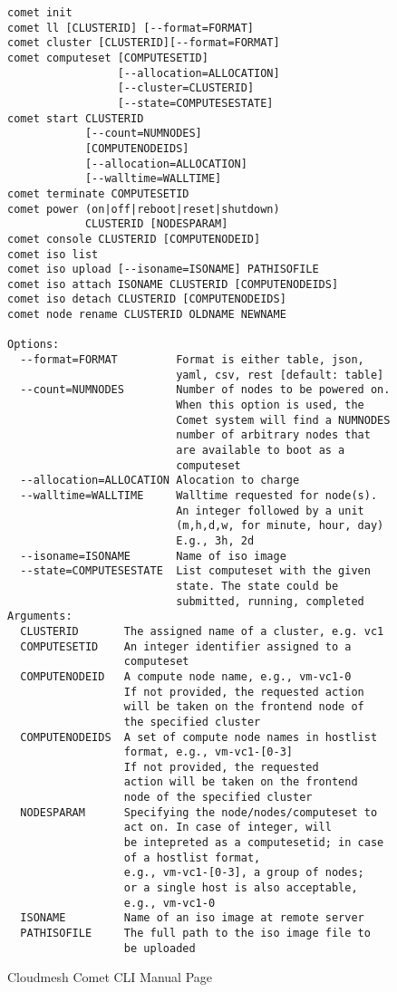 
\begin{figure}[!h]
\begin{small}
\begin{verbatim}
comet init
comet ll [CLUSTERID] [--format=FORMAT]
comet cluster [CLUSTERID][--format=FORMAT]
comet computeset [COMPUTESETID]
                 [--allocation=ALLOCATION]
                 [--cluster=CLUSTERID]
                 [--state=COMPUTESESTATE]
comet start CLUSTERID 
            [--count=NUMNODES]
            [COMPUTENODEIDS]
            [--allocation=ALLOCATION]
            [--walltime=WALLTIME]
comet terminate COMPUTESETID
comet power (on|off|reboot|reset|shutdown) 
            CLUSTERID [NODESPARAM]
comet console CLUSTERID [COMPUTENODEID]
comet iso list
comet iso upload [--isoname=ISONAME] PATHISOFILE
comet iso attach ISONAME CLUSTERID [COMPUTENODEIDS]
comet iso detach CLUSTERID [COMPUTENODEIDS]
comet node rename CLUSTERID OLDNAME NEWNAME

Options:
  --format=FORMAT         Format is either table, json, 
                          yaml, csv, rest [default: table]
  --count=NUMNODES        Number of nodes to be powered on. 
                          When this option is used, the 
                          Comet system will find a NUMNODES 
                          number of arbitrary nodes that
                          are available to boot as a 
                          computeset
  --allocation=ALLOCATION Alocation to charge 
  --walltime=WALLTIME     Walltime requested for node(s).
                          An integer followed by a unit 
                          (m,h,d,w, for minute, hour, day)
                          E.g., 3h, 2d
  --isoname=ISONAME       Name of iso image 
  --state=COMPUTESESTATE  List computeset with the given 
                          state. The state could be
                          submitted, running, completed
Arguments:
  CLUSTERID       The assigned name of a cluster, e.g. vc1
  COMPUTESETID    An integer identifier assigned to a 
                  computeset
  COMPUTENODEID   A compute node name, e.g., vm-vc1-0
                  If not provided, the requested action
                  will be taken on the frontend node of 
                  the specified cluster
  COMPUTENODEIDS  A set of compute node names in hostlist 
                  format, e.g., vm-vc1-[0-3]
                  If not provided, the requested
                  action will be taken on the frontend 
                  node of the specified cluster
  NODESPARAM      Specifying the node/nodes/computeset to
                  act on. In case of integer, will
                  be intepreted as a computesetid; in case 
                  of a hostlist format,
                  e.g., vm-vc1-[0-3], a group of nodes; 
                  or a single host is also acceptable,
                  e.g., vm-vc1-0
  ISONAME         Name of an iso image at remote server
  PATHISOFILE     The full path to the iso image file to 
                  be uploaded
\end{verbatim}
\end{small}
\caption{Cloudmesh Comet CLI Manual Page}\label{F:man}
\end{figure}

